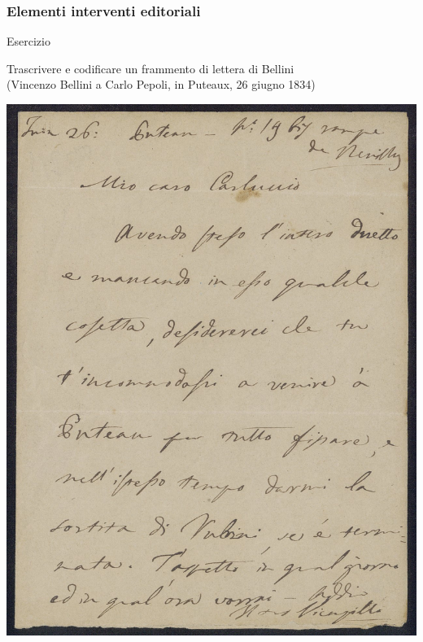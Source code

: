 \begin{frame}
    \frametitle{Elementi interventi editoriali}
    \addtocounter{nframe}{1}
    
   
    \begin{block}{Esercizio}
        \begin{center}
            Trascrivere e codificare un frammento di lettera di Bellini
            \\(Vincenzo Bellini a Carlo Pepoli, in Puteaux, 26 giugno 1834)
        \end{center}
    \end{block}
    \begin{center}
        \includegraphics[width=.35\textwidth]{imgs/letteraBellini-1a-LL_1_16.jpg}
    \end{center}
\end{frame}
